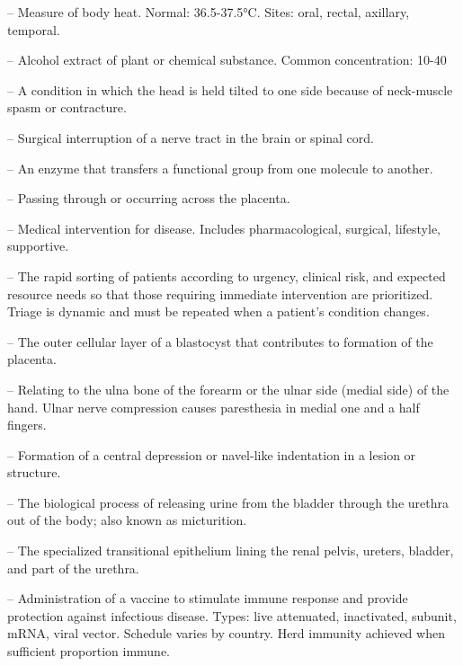 -- Measure of body heat. Normal: 36.5-37.5°C. Sites: oral, rectal, axillary, temporal.

-- Alcohol extract of plant or chemical substance. Common concentration: 10-40%

-- A condition in which the head is held tilted to one side because of neck-muscle spasm or contracture.

-- Surgical interruption of a nerve tract in the brain or spinal cord.

-- An enzyme that transfers a functional group from one molecule to another.

-- Passing through or occurring across the placenta.

-- Medical intervention for disease. Includes pharmacological, surgical, lifestyle, supportive.

-- The rapid sorting of patients according to urgency, clinical risk, and expected resource needs so that those requiring immediate intervention are prioritized. Triage is dynamic and must be repeated when a patient’s condition changes.

-- The outer cellular layer of a blastocyst that contributes to formation of the placenta.

-- Relating to the ulna bone of the forearm or the ulnar side (medial side) of the hand. Ulnar nerve compression causes paresthesia in medial one and a half fingers.

-- Formation of a central depression or navel-like indentation in a lesion or structure.

-- The biological process of releasing urine from the bladder through the urethra out of the body; also known as micturition.

-- The specialized transitional epithelium lining the renal pelvis, ureters, bladder, and part of the urethra.

-- Administration of a vaccine to stimulate immune response and provide protection against infectious disease. Types: live attenuated, inactivated, subunit, mRNA, viral vector. Schedule varies by country. Herd immunity achieved when sufficient proportion immune.

